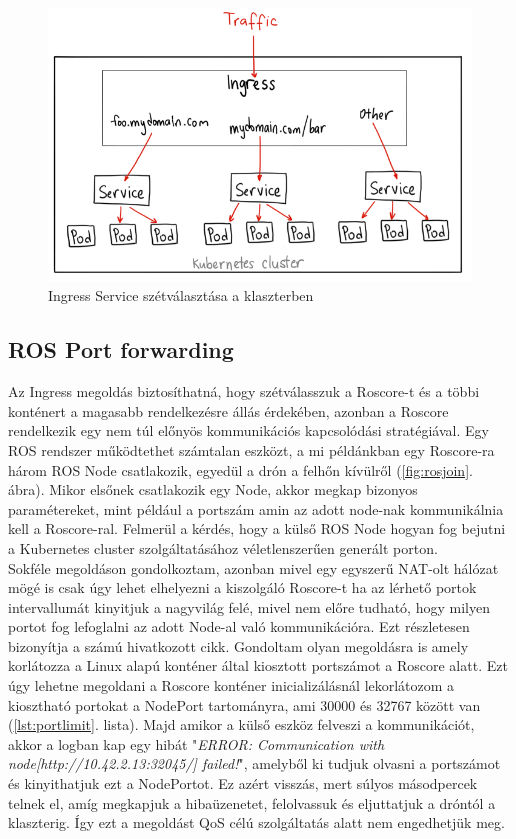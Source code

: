 \begin{figure}
	\centering
	\includegraphics[width=\linewidth]{figures/ingress.png}
	\caption{Ingress Service szétválasztása a klaszterben \cite{nodeport}}
	\label{fig:ingress}
\end{figure}

\subsection{ROS Port forwarding}
Az Ingress megoldás biztosíthatná, hogy szétválasszuk a Roscore-t és a többi konténert a magasabb rendelkezésre állás érdekében, azonban a Roscore rendelkezik egy nem túl előnyös kommunikációs kapcsolódási stratégiával. Egy ROS rendszer működtethet számtalan eszközt, a mi példánkban egy Roscore-ra három ROS Node csatlakozik, egyedül a drón a felhőn kívülről (\ref{fig:rosjoin}. ábra). Mikor elsőnek csatlakozik egy Node, akkor megkap bizonyos paramétereket, mint például a portszám amin az adott node-nak kommunikálnia kell a Roscore-ral. Felmerül a kérdés, hogy a külső ROS Node hogyan fog bejutni a Kubernetes cluster szolgáltatásához véletlenszerűen generált porton. \\

\noindent
Sokféle megoldáson gondolkoztam, azonban mivel egy egyszerű NAT-olt hálózat mögé is csak úgy lehet elhelyezni a kiszolgáló Roscore-t ha az lérhető portok intervallumát kinyitjuk a nagyvilág felé, mivel nem előre tudható, hogy milyen portot fog lefoglalni az adott Node-al való kommunikációra. Ezt részletesen bizonyítja a \cite{portforward} számú hivatkozott cikk. Gondoltam olyan megoldásra is amely korlátozza a Linux alapú konténer által kiosztott portszámot a Roscore alatt. Ezt úgy lehetne megoldani a Roscore konténer inicializálásnál lekorlátozom a kiosztható portokat a NodePort tartományra, ami 30000 és 32767 között van (\ref{lst:portlimit}. lista). Majd amikor a külső eszköz felveszi a kommunikációt, akkor a logban kap egy hibát "\emph{ERROR: Communication with node[http://10.42.2.13:32045/] failed!}", amelyből ki tudjuk olvasni a portszámot és kinyithatjuk ezt a NodePortot. Ez azért visszás, mert súlyos másodpercek telnek el, amíg megkapjuk a hibaüzenetet, felolvassuk és eljuttatjuk a dróntól a klaszterig. Így ezt a megoldást QoS célú szolgáltatás alatt nem engedhetjük meg.

